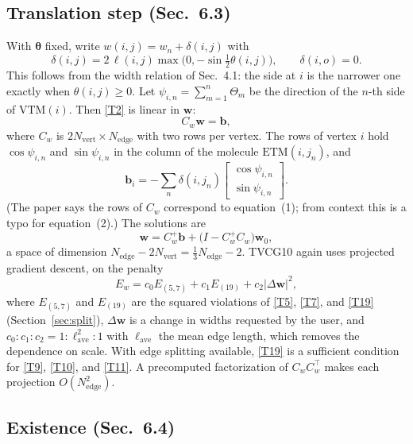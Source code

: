 \documentclass[11pt]{article}
\theoremstyle{definition}
\newcommand{\ETM}{\mathrm{ETM}}
\newcommand{\VTM}{\mathrm{VTM}}
\newcommand{\tv}{\boldsymbol{\theta}}
\newcommand{\wv}{\mathbf{w}}
\newcommand{\Nv}{N_{\mathrm{vert}}}
\newcommand{\Ne}{N_{\mathrm{edge}}}
\begin{document}
\subsection{Translation step (Sec.~6.3)}

With $\tv$ fixed, write $w(i,j) = w_n + \delta(i,j)$ with
\begin{equation}
  \delta(i,j) = 2\,\ell(i,j) \max\bigl(0, -\sin\tfrac12\theta(i,j)\bigr),
  \qquad \delta(i,o) = 0 .
  \label{eq:delta}
\end{equation}
This follows from the width relation of Sec.~4.1: the side at $i$ is the
narrower one exactly when $\theta(i,j) \ge 0$. Let
$\psi_{i,n} = \sum_{m=1}^{n}\Theta_m$ be the direction of the $n$-th side of
$\VTM(i)$. Then \eqref{T2} is linear in $\wv$:
\begin{equation}
  C_w \wv = \mathbf b, \tag{T17}\label{T17}
\end{equation}
where $C_w$ is $2\Nv \times \Ne$ with two rows per vertex. The rows of vertex $i$
hold $\cos\psi_{i,n}$ and $\sin\psi_{i,n}$ in the column of the molecule
$\ETM(i,j_n)$, and
\begin{equation}
  \mathbf b_i = -\sum_{n} \delta(i,j_n)
    \begin{bmatrix}\cos\psi_{i,n}\\ \sin\psi_{i,n}\end{bmatrix} .
  \label{eq:b}
\end{equation}
(The paper says the rows of $C_w$ correspond to equation~(1); from context this
is a typo for equation~(2).) The solutions are
\begin{equation}
  \wv = C_w^+ \mathbf b + \bigl(I - C_w^+ C_w\bigr)\wv_0 ,
  \tag{T18}\label{T18}
\end{equation}
a space of dimension $\Ne - 2\Nv = \frac13\Ne - 2$. TVCG10 again uses projected
gradient descent, on the penalty
\[
  E_w = c_0 E_{(5,7)} + c_1 E_{(19)} + c_2 |\Delta\wv|^2 ,
\]
where $E_{(5,7)}$ and $E_{(19)}$ are the squared violations of \eqref{T5},
\eqref{T7}, and \eqref{T19} (Section~\ref{sec:split}), $\Delta\wv$ is a change in
widths requested by the user, and $c_0 : c_1 : c_2 = 1 : \ell_{\mathrm{ave}}^2 :
1$ with $\ell_{\mathrm{ave}}$ the mean edge length, which removes the dependence
on scale. With edge splitting available, \eqref{T19} is a sufficient condition
for \eqref{T9}, \eqref{T10}, and \eqref{T11}. A precomputed factorization of
$C_w C_w^\top$ makes each projection $O(\Ne^2)$.

\subsection{Existence (Sec.~6.4)}
\end{document}
